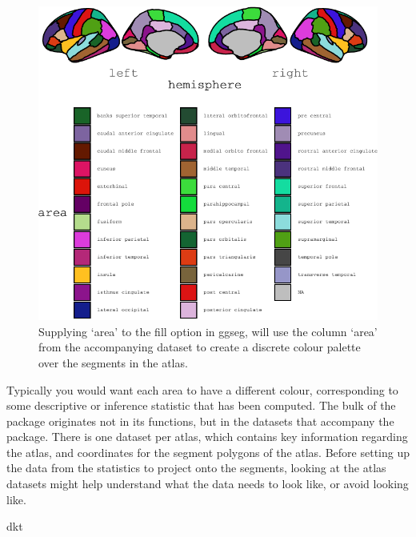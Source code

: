 \documentclass[fleqn,10pt]{wlpeerj} %
\newenvironment{Shaded}{\begin{snugshade}}{\end{snugshade}}
\newcommand{\NormalTok}[1]{#1}
\begin{document}
\begin{figure}
\centering
\includegraphics{draft_1_files/figure-latex/fill-1.pdf}
\caption{\label{fig:fill}Supplying `area' to the fill option in ggseg, will use the column `area' from the accompanying dataset to create a discrete colour palette over the segments in the atlas.}
\end{figure}

Typically you would want each area to have a different colour, corresponding to some descriptive or inference statistic that has been computed.
The bulk of the package originates not in its functions, but in the datasets that accompany the package.
There is one dataset per atlas, which contains key information regarding the atlas, and coordinates for the segment polygons of the atlas.
Before setting up the data from the statistics to project onto the segments, looking at the atlas datasets might help understand what the data needs to look like, or avoid looking like.

\small

\begin{Shaded}
\begin{Highlighting}[]
\NormalTok{dkt}
\end{Highlighting}
\end{Shaded}
\end{document}
